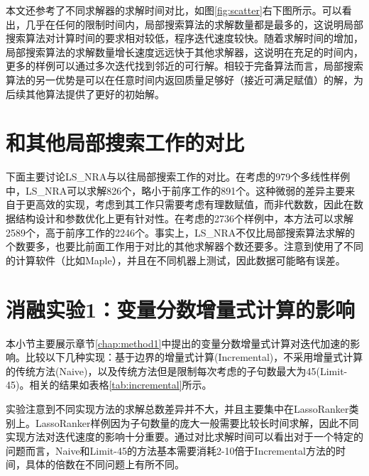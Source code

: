 本文还参考了不同求解器的求解时间对比，如图\ref{fig:scatter}右下图所示。可以看出，几乎在任何的限制时间内，局部搜索算法的求解数量都是最多的，这说明局部搜索算法对计算时间的要求相对较低，程序迭代速度较快。随着求解时间的增加，局部搜索算法的求解数量增长速度远远快于其他求解器，这说明在充足的时间内，更多的样例可以通过多次迭代找到邻近的可行解。相较于完备算法而言，局部搜索算法的另一优势是可以在任意时间内返回质量足够好（接近可满足赋值）的解，为后续其他算法提供了更好的初始解。



\section{和其他局部搜索工作的对比}
下面主要讨论LS\_NRA与以往局部搜索工作的对比。在\cite{multilinear}考虑的979个多线性样例中，LS\_NRA可以求解826个，略小于前序工作的891个。这种微弱的差异主要来自于\cite{multilinear}更高效的实现，考虑到其工作只需要考虑有理数赋值，而非代数数，因此在数据结构设计和参数优化上更有针对性。在\cite{LiXZ23}考虑的2736个样例中，本方法可以求解2589个，高于前序工作的2246个。事实上，LS\_NRA不仅比局部搜索算法求解的个数要多，也要比前面工作用于对比的其他求解器个数还要多。注意到\cite{LiXZ23}使用了不同的计算软件（比如Maple），并且在不同机器上测试，因此数据可能略有误差。


\section{消融实验1：变量分数增量式计算的影响}
本小节主要展示章节\ref{chap:method1}中提出的变量分数增量式计算对迭代加速的影响。比较以下几种实现：基于边界的增量式计算(Incremental)，不采用增量式计算的传统方法(Naive)，以及传统方法但是限制每次考虑的子句数最大为45(Limit-45)。相关的结果如表格\ref{tab:incremental}所示。

实验注意到不同实现方法的求解总数差异并不大，并且主要集中在LassoRanker类别上。LassoRanker样例因为子句数量的庞大一般需要比较长时间求解，因此不同实现方法对迭代速度的影响十分重要。通过对比求解时间可以看出对于一个特定的问题而言，Naive和Limit-45的方法基本需要消耗2-10倍于Incremental方法的时间，具体的倍数在不同问题上有所不同。

